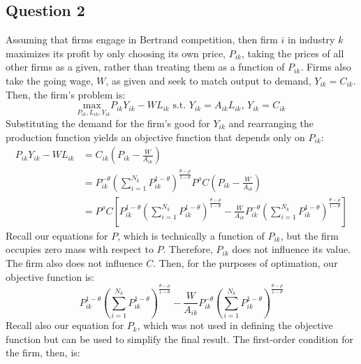 \documentclass{article}
\newcommand{\usmax}[1]{\underset{#1}{\text{max }}}
\newcommand{\sumnk}{\sum_{i=1}^{N_k}}
\begin{document}

\subsection*{Question 2}

Assuming that firms engage in Bertrand competition, then firm $i$ in industry $k$ maximizes its profit by only choosing its own price, $P_{ik}$, taking the prices of all other firms as a given, rather than treating them as a function of $P_{ik}$. Firms also take the going wage, $W$, as given and seek to match output to demand, ${Y_{ik}=C_{ik}}$. Then, the firm's problem is:
\[
	\usmax{P_{ik},L_{ik},Y_{ik}}P_{ik}Y_{ik} - WL_{ik} \text{ s.t. } Y_{ik} = A_{ik}L_{ik}\text{, }Y_{ik} = C_{ik}
\]
Substituting the demand for the firm's good for $Y_{ik}$ and rearranging the production function yields an objective function that depends only on $P_{ik}$:
{\small \begin{align*}
	P_{ik}Y_{ik} - WL_{ik} 	&= C_{ik}\left(P_{ik}-\frac{W}{A_{ik}}\right)																		\\
							&=  P_{ik}^{-\theta} \left(\sumnk P_{ik}^{1-\theta}\right)^{\frac{\theta-\rho}{1-\theta}}P^\rho C
								\left(P_{ik}-\frac{W}{A_{ik}}\right)																			\\
							&=  P^\rho C \left[P_{ik}^{1-\theta} \left(\sumnk P_{ik}^{1-\theta}\right)^{\frac{\theta-\rho}{1-\theta}}
								- \frac{W}{A_{ik}}P_{ik}^{-\theta} \left(\sumnk P_{ik}^{1-\theta}\right)^{\frac{\theta-\rho}{1-\theta}}\right]
\end{align*} }
Recall our equations for $P$, which is technically a function of $P_{ik}$, but the firm occupies zero mass with respect to $P$. Therefore, $P_{ik}$ does not influence its value. The firm also does not influence $C$. Then, for the purposes of optimation, our objective function is:
\[
	P_{ik}^{1-\theta} \left(\sumnk P_{ik}^{1-\theta}\right)^{\frac{\theta-\rho}{1-\theta}}
								- \frac{W}{A_{ik}}P_{ik}^{-\theta} \left(\sumnk P_{ik}^{1-\theta}\right)^{\frac{\theta-\rho}{1-\theta}}
\]
Recall also our equation for $P_k$, which was not used in defining the objective function but can be used to simplify the final result. The first-order condition for the firm, then, is:
\end{document}
